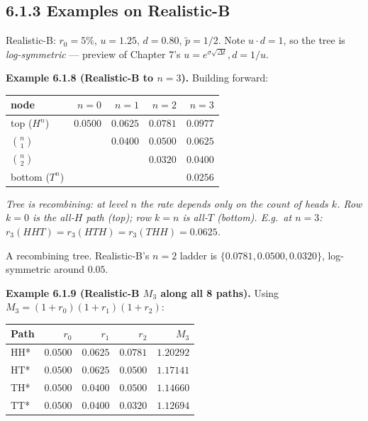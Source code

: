 \documentclass[
  10pt,
  twoside]{book}
\newcounter{none} %
\begin{document}
\subsection{6.1.3 Examples on
Realistic-B}\label{examples-on-realistic-b}

Realistic-B: \(r_0 = 5\%\), \(u = 1.25\), \(d = 0.80\),
\(\tilde p = 1/2\). Note \(u \cdot d = 1\), so the tree is
\emph{log-symmetric} --- preview of Chapter 7's
\(u = e^{\sigma\sqrt{\Delta t}}, d = 1/u\).

\textbf{Example 6.1.8 (Realistic-B to \(n=3\)).} Building forward:

{\def\LTcaptype{none} %
\begin{table}[H]
\centering
\begin{tabular}{|l|r|r|r|r|}
\toprule
node & \(n = 0\) & \(n = 1\) & \(n = 2\) & \(n = 3\) \\
\midrule



top (\(H^n\)) & \(0.0500\) & \(0.0625\) & \(0.0781\) & \(0.0977\) \\
\(\binom{n}{1}\) & & \(0.0400\) & \(0.0500\) & \(0.0625\) \\
\(\binom{n}{2}\) & & & \(0.0320\) & \(0.0400\) \\
bottom (\(T^n\)) & & & & \(0.0256\) \\
\bottomrule
\end{tabular}
\end{table}
}

\emph{Tree is recombining: at level \(n\) the rate depends only on the
count of heads \(k\). Row \(k = 0\) is the all-\(H\) path (top); row
\(k = n\) is all-\(T\) (bottom). E.g.~at \(n=3\):
\(r_3(HHT) = r_3(HTH) = r_3(THH) = 0.0625\).}

A recombining tree. Realistic-B's \(n=2\) ladder is
\(\{0.0781, 0.0500, 0.0320\}\), log-symmetric around \(0.05\).

\textbf{Example 6.1.9 (Realistic-B \(M_3\) along all 8 paths).} Using
\(M_3 = (1 + r_0)(1 + r_1)(1 + r_2)\):

{\def\LTcaptype{none} %
\begin{table}[H]
\centering
\begin{tabular}{|l|r|r|r|r|}
\toprule
Path & \(r_0\) & \(r_1\) & \(r_2\) & \(M_3\) \\
\midrule



HH* & \(0.0500\) & \(0.0625\) & \(0.0781\) & \(1.20292\) \\
HT* & \(0.0500\) & \(0.0625\) & \(0.0500\) & \(1.17141\) \\
TH* & \(0.0500\) & \(0.0400\) & \(0.0500\) & \(1.14660\) \\
TT* & \(0.0500\) & \(0.0400\) & \(0.0320\) & \(1.12694\) \\
\bottomrule
\end{tabular}
\end{table}
}
\end{document}
